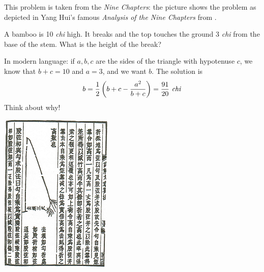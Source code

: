 \begin{minipage}[t]{0.65\linewidth}\vspace{0pt}
This problem is taken from the \emph{Nine Chapters}: the picture shows the problem as depicted in Yang Hui's famous \emph{Analysis of the Nine Chapters} from .\smallbreak

A bamboo is 10 \emph{chi} high. It breaks and the top touches the ground 3 \emph{chi} from the base of the stem. What is the height of the break?\smallbreak

In modern language: if $a,b,c$ are the sides of the triangle with hypotenuse $c$, we know that $b+c=10$ and $a=3$, and we want $b$. The solution is
\[b=\frac 12\left(b+c-\frac{a^2}{b+c}\right)=\frac{91}{20}\text{ \emph{chi}}\]
Think about why!
\end{minipage}\hfill
\begin{minipage}[t]{0.33\linewidth}\vspace{0pt}
\flushright\includegraphics[scale=1]{bamboo-small}
\end{minipage}



